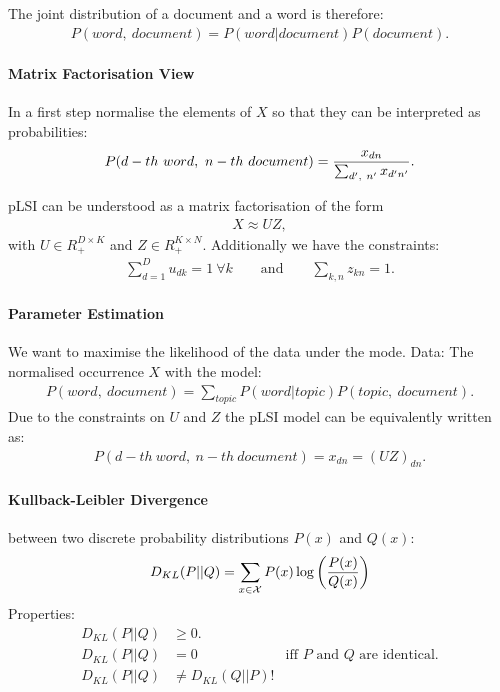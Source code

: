 The joint distribution of a document and a word is therefore:
\begin{align*}
    P(word,\ document) = P(word|document)P(document).
\end{align*}

\paragraph{Matrix Factorisation View} In a first step normalise the elements of $X$ so that they can be interpreted as probabilities:
\begin{align*}
    P(d-th\ word,\ n-th\ document) = {x_{dn}\over \sum_{d',\ n'} x_{d'n'}}.
\end{align*}

pLSI can be understood as a matrix factorisation of the form
\begin{align*}
    X\approx UZ,
\end{align*}
with $U\in R_+^{D\times K}$ and $Z\in R_+^{K\times N}$. Additionally we have the constraints:
\begin{align*}
    \sum_{d=1}^D u_{dk} = 1\ \forall k\qquad \text{and}\qquad \sum_{k,n} z_{kn} =1.
\end{align*}

\paragraph{Parameter Estimation} We want to maximise the likelihood of the data under the mode. Data: The normalised occurrence $X$ with the model:
\begin{align*}
    P(word,\ document) = \sum_{topic} P(word|topic) P(topic,\ document).
\end{align*}
Due to the constraints on $U$ and $Z$ the pLSI model can be equivalently written as:
\begin{align*}
P(d-th\ word,\ n-th\ document) = x_{dn} = (UZ)_{dn}.
\end{align*}

\paragraph{Kullback-Leibler Divergence} between two discrete probability distributions $P(x)$ and $Q(x)$:
\begin{align*}
    D_{KL} (P||Q) = \sum_{x\in \mathcal X} P(x) \log \left(
        {P(x)\over Q(x)}
        \right)
\end{align*}
Properties:
\begin{align*}
    D_{KL} (P||Q) &\geq 0.\\
    D_{KL} (P||Q) &= 0 &\text{iff $P$ and $Q$ are identical.}\\
    D_{KL}(P||Q) &\neq D_{KL}(Q||P)!
\end{align*}

